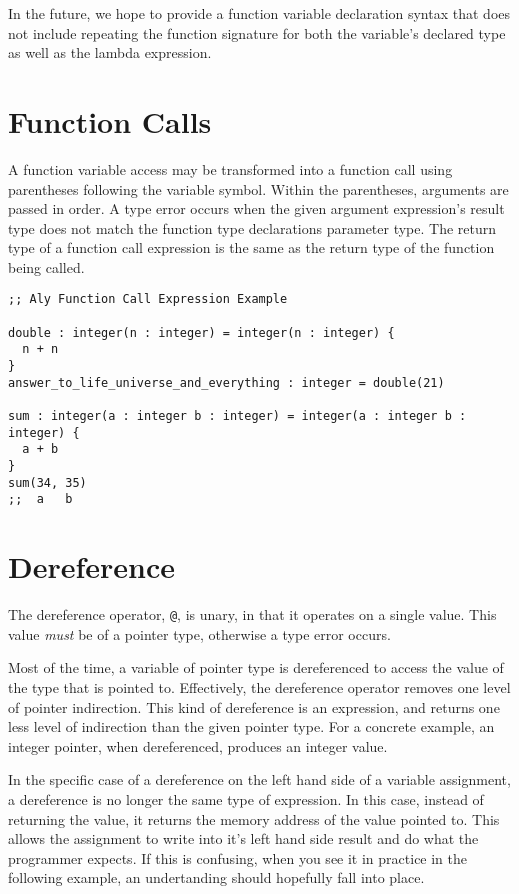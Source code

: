 \documentclass[12pt]{report}
\begin{document}
In the future, we hope to provide a function variable declaration syntax that does not include repeating the function signature for both the variable's declared type as well as the lambda expression.

\section{Function Calls}
\label{subsec:expressions-calls}

A function variable access may be transformed into a function call using parentheses following the variable symbol. Within the parentheses, arguments are passed in order. A type error occurs when the given argument expression's result type does not match the function type declarations parameter type. The return type of a function call expression is the same as the return type of the function being called.

\begin{Verbatim}[samepage=true]
;; Aly Function Call Expression Example

double : integer(n : integer) = integer(n : integer) {
  n + n
}
answer_to_life_universe_and_everything : integer = double(21)

sum : integer(a : integer b : integer) = integer(a : integer b : integer) {
  a + b
}
sum(34, 35)
;;  a   b
\end{Verbatim}

\section{Dereference}
\label{subsec:expressions-dereference}

The dereference operator, \verb|@|, is unary, in that it operates on a single value. This value \emph{must} be of a pointer type, otherwise a type error occurs.

Most of the time, a variable of pointer type is dereferenced to access the value of the type that is pointed to. Effectively, the dereference operator removes one level of pointer indirection. This kind of dereference is an expression, and returns one less level of indirection than the given pointer type. For a concrete example, an integer pointer, when dereferenced, produces an integer value.

In the specific case of a dereference on the left hand side of a variable assignment, a dereference is no longer the same type of expression. In this case, instead of returning the value, it returns the memory address of the value pointed to. This allows the assignment to write into it's left hand side result and do what the programmer expects. If this is confusing, when you see it in practice in the following example, an undertanding should hopefully fall into place.
\end{document}
